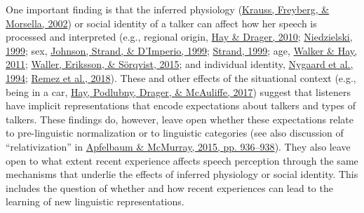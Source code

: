 \documentclass[
  11pt,
  man,floatsintext]{apa6}
\begin{document}
One important finding is that the inferred physiology (\protect\hyperlink{ref-krauss2002}{Krauss, Freyberg, \& Morsella, 2002}) or social identity of a talker can affect how her speech is processed and interpreted (e.g., regional origin, \protect\hyperlink{ref-hay-drager2010}{Hay \& Drager, 2010}; \protect\hyperlink{ref-niedzielski1999}{Niedzielski, 1999}; sex, \protect\hyperlink{ref-johnson1999}{Johnson, Strand, \& D'Imperio, 1999}; \protect\hyperlink{ref-strand1999}{Strand, 1999}; age, \protect\hyperlink{ref-walker-hay2011}{Walker \& Hay, 2011}; \protect\hyperlink{ref-skoogwaller2015}{Waller, Eriksson, \& Sörqvist, 2015}; and individual identity, \protect\hyperlink{ref-nygaard1994}{Nygaard et al., 1994}; \protect\hyperlink{ref-remez2018}{Remez et al., 2018}). These and other effects of the situational context (e.g., being in a car, \protect\hyperlink{ref-hay2017}{Hay, Podlubny, Drager, \& McAuliffe, 2017}) suggest that listeners have implicit representations that encode expectations about talkers and types of talkers. These findings do, however, leave open whether these expectations relate to pre-linguistic normalization or to linguistic categories (see also discussion of ``relativization'' in \protect\hyperlink{ref-apfelbaum-mcmurray2015}{Apfelbaum \& McMurray, 2015, pp. 936--938}). They also leave open to what extent recent experience affects speech perception through the same mechanisms that underlie the effects of inferred physiology or social identity. This includes the question of whether and how recent experiences can lead to the learning of new linguistic representations.
\end{document}
